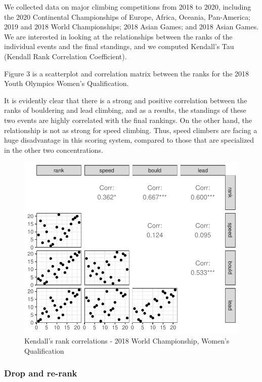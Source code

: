 \documentclass[12pt]{article}
\begin{document}
We collected data on major climbing competitions from 2018 to 2020,
including the 2020 Continental Championships of Europe, Africa, Oceania,
Pan-America; 2019 and 2018 World Championships; 2018 Asian Games; and
2018 Asian Games. We are interested in looking at the relationships
between the ranks of the individual events and the final standings, and
we computed Kendall's Tau (Kendall Rank Correlation Coefficient).

Figure 3 is a scatterplot and correlation matrix between the ranks for
the 2018 Youth Olympics Women's Qualification.

It is evidently clear that there is a strong and positive correlation
between the ranks of bouldering and lead climbing, and as a results, the
standings of these two events are highly correlated with the final
rankings. On the other hand, the relationship is not as strong for speed
climbing. Thus, speed climbers are facing a huge disadvantage in this
scoring system, compared to those that are specialized in the other two
concentrations.

\begin{figure}
\centering
\includegraphics{draft_files/figure-latex/unnamed-chunk-9-1.pdf}
\caption{Kendall's rank correlations - 2018 World Championship, Women's
Qualification}
\end{figure}

\hypertarget{drop-and-re-rank}{%
\subsubsection{Drop and re-rank}\label{drop-and-re-rank}}



\end{document}
